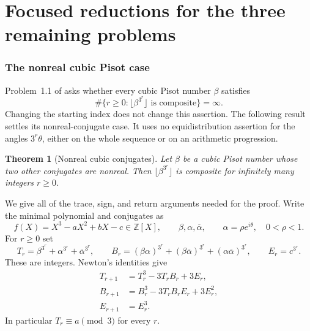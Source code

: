 \documentclass[11pt,a4paper]{article}
\newtheorem{theorem}{Theorem}[section]
\theoremstyle{definition}
\theoremstyle{remark}
\numberwithin{equation}{section}
\begin{document}
\clearpage
\part{Focused reductions for the three remaining problems}
\label{part:focused}
\section{The nonreal cubic Pisot case}
\label{ft:sec:nonreal-cubic}

Problem~1.1 of \cite{SaitoIntervals} asks whether every cubic Pisot
number $\beta$ satisfies
\[
 \#\{r\geq 0:\lfloor\beta^{3^r}\rfloor\text{ is composite}\}=\infty.
\]
Changing the starting index does not change this assertion. The following
result settles its nonreal-conjugate case. It uses no equidistribution
assertion for the angles $3^r\theta$, either on the whole sequence or
on an arithmetic progression.

\begin{theorem}[Nonreal cubic conjugates]
\label{ft:thm:nonreal-cubic}
Let $\beta$ be a cubic Pisot number whose two other conjugates are
nonreal. Then $\lfloor\beta^{3^r}\rfloor$ is composite for infinitely
many integers $r\geq0$.
\end{theorem}

We give all of the trace, sign, and return arguments needed for the proof.
Write the minimal polynomial and conjugates as
\[
 f(X)=X^3-aX^2+bX-c\in\mathbb Z[X],
 \qquad \beta,\alpha,\overline\alpha,
 \qquad \alpha=\rho e^{i\theta},\quad 0<\rho<1.
\]
For $r\geq0$ set
\[
 T_r=\beta^{3^r}+\alpha^{3^r}+\overline\alpha^{3^r},\qquad
 B_r=(\beta\alpha)^{3^r}+(\beta\overline\alpha)^{3^r}
       +(\alpha\overline\alpha)^{3^r},\qquad E_r=c^{3^r}.
\]
These are integers. Newton's identities give
\begin{equation}\label{ft:eq:cubic-newton}
 \begin{split}
 T_{r+1}&=T_r^3-3T_rB_r+3E_r,\\
 B_{r+1}&=B_r^3-3T_rB_rE_r+3E_r^2,\\
 E_{r+1}&=E_r^3.
 \end{split}
\end{equation}
In particular $T_r\equiv a\pmod3$ for every $r$.
\end{document}
